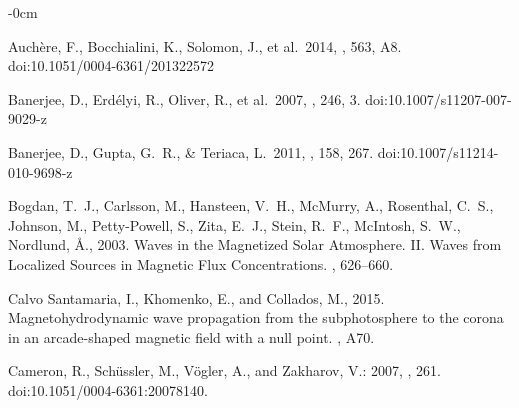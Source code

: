 \documentclass[physics,article,submit,pdftex,moreauthors]{Definitions/mdpi}
\begin{document}
\begin{adjustwidth}{-\extralength}{0cm}



%

\begin{thebibliography}{999}
 Auch{\`e}re, F., Bocchialini, K., Solomon, J., et al.\ 2014, \aap, 563, A8. doi:10.1051/0004-6361/201322572

 Banerjee, D., Erd{\'e}lyi, R., Oliver, R., et al.\ 2007, \solphys, 246, 3. doi:10.1007/s11207-007-9029-z

 Banerjee, D., Gupta, G.~R., \& Teriaca, L.\ 2011, \ssr, 158, 267. doi:10.1007/s11214-010-9698-z

{Bogdan}, T.~J., {Carlsson}, M., {Hansteen}, V.~H., {McMurry}, A., {Rosenthal},
  C.~S., {Johnson}, M., {Petty-Powell}, S., {Zita}, E.~J., {Stein}, R.~F.,
  {McIntosh}, S.~W., {Nordlund}, {\AA}., 2003. {Waves in the Magnetized Solar
  Atmosphere. II. Waves from Localized Sources in Magnetic Flux
  Concentrations}. , 626--660.

 {Calvo Santamaria}, I., {Khomenko}, E.,  and {Collados}, M., 2015. {Magnetohydrodynamic wave propagation from the subphotosphere to the corona in an arcade-shaped magnetic field with a null point}. , A70.

Cameron, R., Sch{\"u}ssler, M., V{\"o}gler, A., and Zakharov, V.: 2007, , 261. doi:10.1051/0004-6361:20078140.







\end{thebibliography}
\end{adjustwidth}
\end{document}
